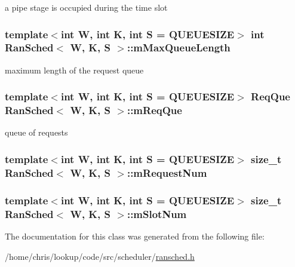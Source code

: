 a pipe stage is occupied during the time slot 

\hypertarget{classRanSched_a9457935e91ae686748d8d458b5ed9c2c}{
\subsubsection[{m\-Max\-Queue\-Length}]{\setlength{\rightskip}{0pt plus 5cm}template$<$int W, int K, int S = Q\-U\-E\-U\-E\-S\-I\-Z\-E$>$ int {\bf Ran\-Sched}$<$ {\bf W}, K, S $>$\-::m\-Max\-Queue\-Length\hspace{0.3cm}{\ttfamily [private]}}}\label{classRanSched_a9457935e91ae686748d8d458b5ed9c2c}


maximum length of the request queue 

\hypertarget{classRanSched_af9be4c8624431923a682d85ea61bba5c}{
\subsubsection[{m\-Req\-Que}]{\setlength{\rightskip}{0pt plus 5cm}template$<$int W, int K, int S = Q\-U\-E\-U\-E\-S\-I\-Z\-E$>$ {\bf Req\-Que} {\bf Ran\-Sched}$<$ {\bf W}, K, S $>$\-::m\-Req\-Que}}\label{classRanSched_af9be4c8624431923a682d85ea61bba5c}


queue of requests 

\hypertarget{classRanSched_ad79f85e0945332c83f94c815fed24181}{
\subsubsection[{m\-Request\-Num}]{\setlength{\rightskip}{0pt plus 5cm}template$<$int W, int K, int S = Q\-U\-E\-U\-E\-S\-I\-Z\-E$>$ size\-\_\-t {\bf Ran\-Sched}$<$ {\bf W}, K, S $>$\-::m\-Request\-Num\hspace{0.3cm}{\ttfamily [private]}}}\label{classRanSched_ad79f85e0945332c83f94c815fed24181}
\hypertarget{classRanSched_ab846e49a0f4dadfbae2a394af599164c}{
\subsubsection[{m\-Slot\-Num}]{\setlength{\rightskip}{0pt plus 5cm}template$<$int W, int K, int S = Q\-U\-E\-U\-E\-S\-I\-Z\-E$>$ size\-\_\-t {\bf Ran\-Sched}$<$ {\bf W}, K, S $>$\-::m\-Slot\-Num\hspace{0.3cm}{\ttfamily [private]}}}\label{classRanSched_ab846e49a0f4dadfbae2a394af599164c}


The documentation for this class was generated from the following file\-:\begin{DoxyCompactItemize}
\item 
/home/chris/lookup/code/src/scheduler/\hyperlink{ransched_8h}{ransched.\-h}\end{DoxyCompactItemize}
